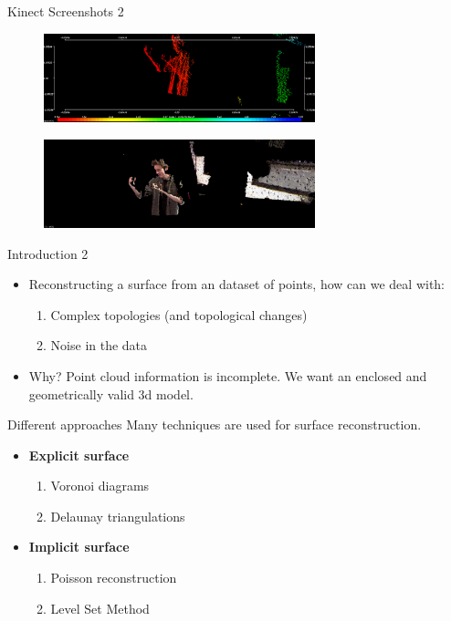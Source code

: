 \documentclass{beamer}
\begin{document}
\begin{frame}{Kinect Screenshots 2}
  \begin{figure}[H]
  \centering
  \includegraphics[width=0.7\textwidth]{img/pts.png}
  \end{figure}
  \begin{figure}[H]
  \centering
  \includegraphics[width=0.7\textwidth]{img/pcl.png}
  \end{figure}
\end{frame}

\begin{frame}{Introduction 2}
  \begin{itemize}
  \item Reconstructing a surface from an dataset of points, how can we deal with:
  \begin{enumerate}
    \item Complex topologies (and topological changes)
    \item Noise in the data
  \end{enumerate}
  \item Why? Point cloud information is incomplete. We want an enclosed and geometrically valid 3d model.
  \end{itemize}
\end{frame}

\begin{frame}{Different approaches}
  Many techniques are used for surface reconstruction.
  \begin{itemize} %
  \item \textbf{Explicit surface} %
  \begin{enumerate}
    \item Voronoi diagrams %
    \item Delaunay triangulations
  \end{enumerate}
  \item \textbf{Implicit surface} %
  \begin{enumerate}
    \item Poisson reconstruction
    \item Level Set Method
  \end{enumerate}
  \end{itemize}
\end{frame}
\end{document}
